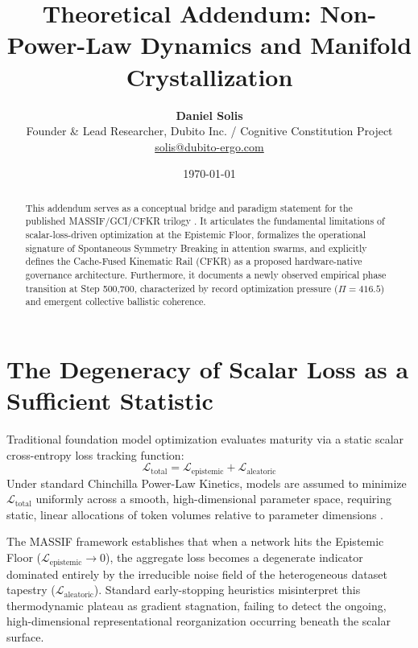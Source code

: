 \documentclass[11pt]{article}
\title{\textbf{Theoretical Addendum: Non-Power-Law Dynamics and Manifold Crystallization}}
\author{\textbf{Daniel Solis} \\ 
\small Founder \& Lead Researcher, Dubito Inc. / Cognitive Constitution Project \\ 
\small \href{mailto:solis@dubito-ergo.com}{solis@dubito-ergo.com}}
\date{\today}
\begin{document}
\maketitle

\begin{abstract}
This addendum serves as a conceptual bridge and paradigm statement for the published MASSIF/GCI/CFKR trilogy \cite{massif2026, gci2026, cfkr2026}. It articulates the fundamental limitations of scalar-loss-driven optimization at the Epistemic Floor, formalizes the operational signature of Spontaneous Symmetry Breaking in attention swarms, and explicitly defines the Cache-Fused Kinematic Rail (CFKR) as a proposed hardware-native governance architecture. Furthermore, it documents a newly observed empirical phase transition at Step 500,700, characterized by record optimization pressure ($\Pi = 416.5$) and emergent collective ballistic coherence.
\end{abstract}

\section{The Degeneracy of Scalar Loss as a Sufficient Statistic}
Traditional foundation model optimization evaluates maturity via a static scalar cross-entropy loss tracking function:
\begin{equation}
\mathcal{L}_{\text{total}} = \mathcal{L}_{\text{epistemic}} + \mathcal{L}_{\text{aleatoric}}
\end{equation}
Under standard Chinchilla Power-Law Kinetics, models are assumed to minimize $\mathcal{L}_{\text{total}}$ uniformly across a smooth, high-dimensional parameter space, requiring static, linear allocations of token volumes relative to parameter dimensions \cite{chinchilla}. 

The MASSIF framework establishes that when a network hits the Epistemic Floor ($\mathcal{L}_{\text{epistemic}} \to 0$), the aggregate loss becomes a degenerate indicator dominated entirely by the irreducible noise field of the heterogeneous dataset tapestry ($\mathcal{L}_{\text{aleatoric}}$). Standard early-stopping heuristics misinterpret this thermodynamic plateau as gradient stagnation, failing to detect the ongoing, high-dimensional representational reorganization occurring beneath the scalar surface.
\end{document}

